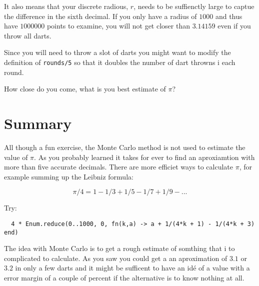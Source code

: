 \documentclass[a4paper,11pt]{article}
\begin{document}
It also means that your discrete radious, $r$, needs to be suffienctly
large to captue the difference in the sixth decimal. If you only have
a radius of $1 000$ and thus have $1 000 000$ points to examine, you
will not get closer than $3.14159$ even if you throw all darts.

Since you will need to throw a slot of darts you  might
want to modify the definition of {\tt rounds/5} so that it doubles the
number of dart throwns i each round.

How close do you come, what is you best estimate of $\pi$?

\section*{Summary}

All though a fun exercise, the Monte Carlo method is not used to
estimate the value of $\pi$. As you probably learned it takes for ever
to find an aproxiamtion with more than five accurate decimals. There
are more efficiet ways to calculate $\pi$, for example summing up the
Leibniz formula:

$$\pi/4 = 1 - 1/3 + 1/5 - 1/7 + 1/9 - ... $$

Try:

\begin{verbatim}
  4 * Enum.reduce(0..1000, 0, fn(k,a) -> a + 1/(4*k + 1) - 1/(4*k + 3) end)
\end{verbatim}

The idea with Monte Carlo is to get a rough estimate of somthing that
i to complicated to calculate. As you saw you could get a an
aproximation of $3.1$ or $3.2$ in only a few darts and it might be
sufficent to have an idé of a value with a error margin of a couple of
percent if the alternative is to know nothing at all.


  
\end{document}
